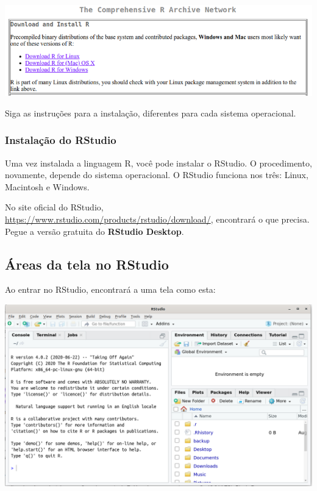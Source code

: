 \documentclass[
]{article}
\begin{document}
\begin{center}\includegraphics[width=1\linewidth]{downloadR} \end{center}

Siga as instruções para a instalação, diferentes para cada sistema
operacional.

\hypertarget{instalauxe7uxe3o-do-rstudio}{%
\subsubsection{Instalação do
RStudio}\label{instalauxe7uxe3o-do-rstudio}}

Uma vez instalada a linguagem R, você pode instalar o RStudio. O
procedimento, novamente, depende do sistema operacional. O RStudio
funciona nos três: Linux, Macintosh e Windows.

No site oficial do RStudio,
\url{https://www.rstudio.com/products/rstudio/download/}, encontrará o
que precisa. Pegue a versão gratuita do \textbf{RStudio Desktop}.

\hypertarget{uxe1reas-da-tela-no-rstudio}{%
\subsection{Áreas da tela no
RStudio}\label{uxe1reas-da-tela-no-rstudio}}

Ao entrar no RStudio, encontrará a uma tela como esta:

\begin{center}\includegraphics[width=0.9\linewidth]{RStudio_firstscreen} \end{center}
\end{document}
